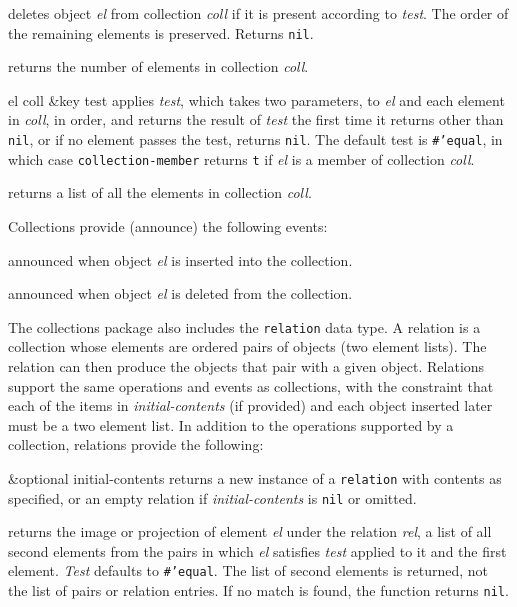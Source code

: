\documentclass[twoside,openright,11pt]{report}
\newcommand{\tp}[1]{\texttt{#1}}
\begin{document}
{deletes object \emph{el} from collection \emph{coll} if it is present
according to \emph{test}.  The order of the remaining elements is
preserved.  Returns \tp{nil}.}

{returns the number of elements in collection \emph{coll}.}

{el coll \&key test}
{applies \emph{test}, which takes two parameters, to \emph{el} and
each element in \emph{coll}, in order, and returns the result of
\emph{test} the first time it returns other than \tp{nil}, or if no
element passes the test, returns \tp{nil}.  The default test is
\tp{\#'equal}, in which case \tp{collection-member} returns \tp{t} if
\emph{el} is a member of collection \emph{coll}.}

{returns a list of all the elements in collection \emph{coll}.}

Collections provide (announce) the following events:

{announced when object \emph{el} is inserted into the collection.}

{announced when object \emph{el} is deleted from the collection.}

The collections package also includes the \tp{relation} data type.  A
relation is a collection whose elements are ordered pairs of objects
(two element lists).  The relation can then produce the objects that
pair with a given object.  Relations support the same operations and
events as collections, with the constraint that each of the items in
\emph{initial-contents} (if provided) and each object inserted later
must be a two element list.  In addition to the operations supported
by a collection, relations provide the following:

{\&optional initial-contents}
{returns a new instance of a \tp{relation} with contents as specified,
or an empty relation if \emph{initial-contents} is \tp{nil} or
omitted.}

{returns the image or projection of element \emph{el} under the
relation \emph{rel}, a list of all second elements from the pairs in
which \emph{el} satisfies \emph{test} applied to it and the first
element.  \emph{Test} defaults to \tp{\#'equal}.  The list of second
elements is returned, not the list of pairs or relation entries.  If
no match is found, the function returns \tp{nil}.}
\end{document}
